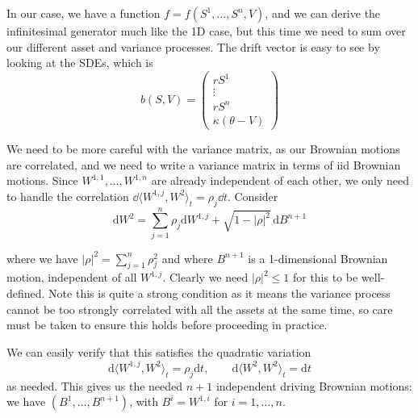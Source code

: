 In our case, we have a function $f = f(S^1, \dots, S^n, V)$, and we can derive the infinitesimal generator much like the 1D case, but this time we need to sum over our different asset and variance processes. The drift vector is easy to see by looking at the SDEs, which is
\begin{equation}
    b(S, V) = \begin{pmatrix}
        rS^1 \\ \vdots \\ rS^n \\ \kappa(\theta - V)
    \end{pmatrix}
\end{equation}

We need to be more careful with the variance matrix, as our Brownian motions are correlated, and we need to write a variance matrix in terms of iid Brownian motions. Since $W^{1, 1}, \dots, W^{1, n}$ are already independent of each other, we only need to handle the correlation $\dd \langle W^{1, j}, W^2\rangle_t = \rho_j \dd t$. Consider
\begin{equation}
    \mathrm dW^2 = \sum_{j=1}^n \rho_j \mathrm dW^{1, j} + \sqrt{1 - |\rho|^2}\,\mathrm dB^{n+1}
\end{equation}

where we have $|\rho|^2 = \sum_{j=1}^n \rho_j^2$ and where $B^{n+1}$ is a 1-dimensional Brownian motion, independent of all $W^{1, j}$. Clearly we need $|\rho|^2 \le 1$ for this to be well-defined. Note this is quite a strong condition as it means the variance process cannot be too strongly correlated with all the assets at the same time, so care must be taken to ensure this holds before proceeding in practice.

We can easily verify that this satisfies the quadratic variation
\begin{equation}
\mathrm d \langle W^{1, j}, W^2\rangle_t = \rho_j \mathrm dt, \qquad \mathrm d \langle W^2, W^2\rangle_t = \mathrm dt
\end{equation}
as needed. This gives us the needed $n+1$ independent driving Brownian motions: we have $(B^1, \dots, B^{n+1})$, with $B^{i} = W^{1, i}$ for $i = 1, \dots, n$.

